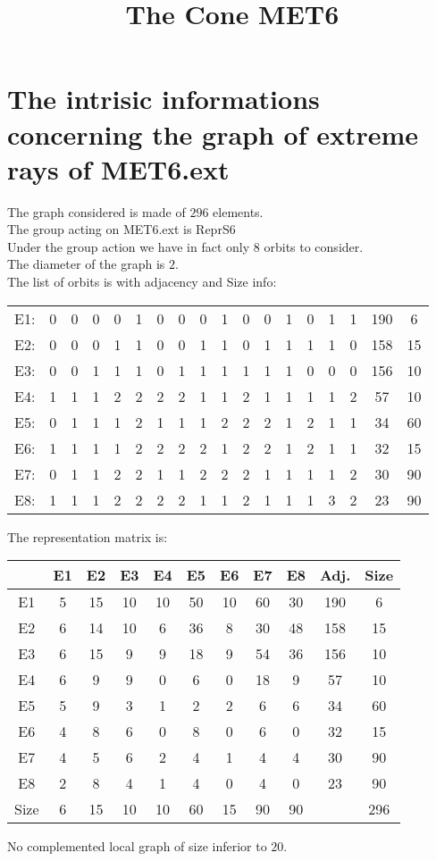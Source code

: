 \documentclass[12pt]{article}
\title{The Cone MET6}
\begin{document}
\maketitle
\section{The intrisic informations concerning the graph of extreme rays of MET6.ext}
The graph considered is made of $296$ elements.\\
The group acting on MET6.ext is ReprS6\\
Under the group action we have in fact only $8$ orbits to consider.\\
The diameter of the graph is $2$.\\
The list of orbits is with adjacency and Size info:
\begin{center}
\scriptsize
\begin{tabular}{cccccccccccccccc|c|c}
E1:&0&0&0&0&1&0&0&0&1&0&0&1&0&1&1&190&6\\
E2:&0&0&0&1&1&0&0&1&1&0&1&1&1&1&0&158&15\\
E3:&0&0&1&1&1&0&1&1&1&1&1&1&0&0&0&156&10\\
E4:&1&1&1&2&2&2&2&1&1&2&1&1&1&1&2&57&10\\
E5:&0&1&1&1&2&1&1&1&2&2&2&1&2&1&1&34&60\\
E6:&1&1&1&1&2&2&2&2&1&2&2&1&2&1&1&32&15\\
E7:&0&1&1&2&2&1&1&2&2&2&1&1&1&1&2&30&90\\
E8:&1&1&1&2&2&2&2&1&1&2&1&1&1&3&2&23&90\\
\end{tabular}
\end{center}
The representation matrix is:
\begin{center}
\scriptsize
\begin{tabular}{|c|cccccccc|c|c|}
\hline
&E1&E2&E3&E4&E5&E6&E7&E8&Adj.&Size\\
\hline
E1& 5& 15& 10& 10& 50& 10& 60& 30&190&6\\
E2& 6& 14& 10& 6& 36& 8& 30& 48&158&15\\
E3& 6& 15& 9& 9& 18& 9& 54& 36&156&10\\
E4& 6& 9& 9& 0& 6& 0& 18& 9&57&10\\
E5& 5& 9& 3& 1& 2& 2& 6& 6&34&60\\
E6& 4& 8& 6& 0& 8& 0& 6& 0&32&15\\
E7& 4& 5& 6& 2& 4& 1& 4& 4&30&90\\
E8& 2& 8& 4& 1& 4& 0& 4& 0&23&90\\
\hline
Size&6&15&10&10&60&15&90&90&&296\\
\hline
\end{tabular}
\end{center}
No complemented local graph of size inferior to $20$.
\end{document}

